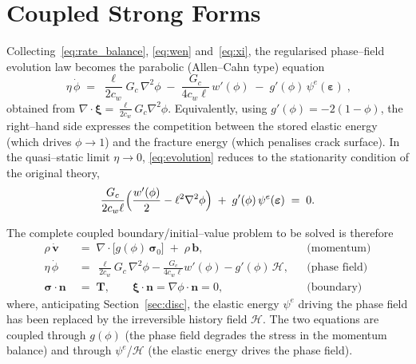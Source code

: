 \documentclass[12pt,a4paper]{article}
\newcommand{\bsig}{\boldsymbol{\sigma}}
\newcommand{\beps}{\boldsymbol{\varepsilon}}
\newcommand{\bxi}{\boldsymbol{\xi}}
\newcommand{\bv}{\mathbf{v}}
\newcommand{\bb}{\mathbf{b}}
\newcommand{\bn}{\mathbf{n}}
\newcommand{\bT}{\mathbf{T}}
\begin{document}
	\section{Coupled Strong Forms}\label{sec:strong}

	Collecting~\eqref{eq:rate_balance}, \eqref{eq:wen} and~\eqref{eq:xi}, the
	regularised phase--field evolution law becomes the parabolic (Allen--Cahn type)
	equation
	\begin{equation}\label{eq:evolution}
		\boxed{\;
		\eta\,\dot{\phi}
		\;=\; \frac{\ell}{2c_w}G_c\,\nabla^2\phi
		\;-\; \frac{G_c}{4c_w\ell}\,w'(\phi)
		\;-\; g'(\phi)\,\psi^e(\beps)\;,}
	\end{equation}
	obtained from $\nabla\cdot\bxi=\tfrac{\ell}{2c_w}G_c\nabla^2\phi$. Equivalently,
	using $g'(\phi)=-2(1-\phi)$, the right--hand side expresses the competition
	between the stored elastic energy (which drives $\phi\to 1$) and the fracture
	energy (which penalises crack surface). In the quasi--static limit $\eta\to 0$,
	\eqref{eq:evolution} reduces to the stationarity condition of the original
	theory,
	\begin{equation}\label{eq:stationary}
		\frac{G_c}{2c_w\ell}\Bigl(\frac{w'(\phi)}{2}-\ell^2\nabla^2\phi\Bigr)
		\;+\; g'(\phi)\,\psi^e(\beps) \;=\; 0 .
	\end{equation}

	The complete coupled boundary/initial--value problem to be solved is therefore
	\begin{subequations}\label{eq:strongall}
	\begin{align}
		\rho\,\dot{\bv} &\;=\; \nabla\cdot\bigl[g(\phi)\,\bsig_0\bigr] \;+\; \rho\,\bb, & &\text{(momentum)} \label{eq:strong_mom}\\[2pt]
		\eta\,\dot{\phi} &\;=\; \frac{\ell}{2c_w}G_c\,\nabla^2\phi - \frac{G_c}{4c_w\ell}w'(\phi) - g'(\phi)\,\mathcal{H}, & &\text{(phase field)} \label{eq:strong_pf}\\[2pt]
		\bsig\cdot\bn &\;=\; \bT, \qquad \bxi\cdot\bn=\nabla\phi\cdot\bn=0, & &\text{(boundary)} \label{eq:strong_bc}
	\end{align}
	\end{subequations}
	where, anticipating Section~\ref{sec:disc}, the elastic energy
	$\psi^e$ driving the phase field has been replaced by the irreversible history
	field $\mathcal{H}$. The two equations are coupled through $g(\phi)$ (the phase
	field degrades the stress in the momentum balance) and through
	$\psi^e$/$\mathcal{H}$ (the elastic energy drives the phase field).
\end{document}
